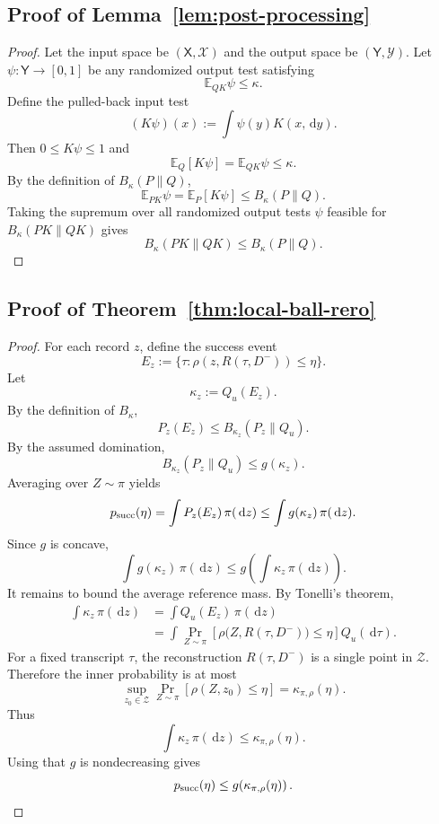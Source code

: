\documentclass[11pt,a4paper]{report}
\theoremstyle{plain}
\theoremstyle{definition}
\theoremstyle{remark}
\newcommand{\E}{\mathbb{E}}
\newcommand{\cZ}{\mathcal{Z}}
\newcommand{\dd}{\,\mathrm d}
\begin{document}
\subsection{Proof of Lemma~\ref{lem:post-processing}}

\begin{proof}
Let the input space be $(\mathsf X,\mathcal X)$ and the output space be
$(\mathsf Y,\mathcal Y)$.  Let $\psi:\mathsf Y\to[0,1]$ be any randomized output
test satisfying
\[
\E_{QK}\psi\le \kappa.
\]
Define the pulled-back input test
\[
(K\psi)(x):=\int \psi(y)K(x,\dd y).
\]
Then $0\le K\psi\le1$ and
\[
\E_Q[K\psi]=\E_{QK}\psi\le\kappa.
\]
By the definition of $B_\kappa(P\|Q)$,
\[
\E_{PK}\psi=
\E_P[K\psi]
\le
B_\kappa(P\|Q).
\]
Taking the supremum over all randomized output tests $\psi$ feasible for
$B_\kappa(PK\|QK)$ gives
\[
B_\kappa(PK\|QK)\le B_\kappa(P\|Q).
\]
\end{proof}

\subsection{Proof of Theorem~\ref{thm:local-ball-rero}}

\begin{proof}
For each record $z$, define the success event
\[
E_z:=\{\tau:\rho(z,R(\tau,D^-))\le\eta\}.
\]
Let
\[
\kappa_z:=Q_u(E_z).
\]
By the definition of $B_\kappa$,
\[
P_z(E_z)\le B_{\kappa_z}(P_z\|Q_u).
\]
By the assumed domination,
\[
B_{\kappa_z}(P_z\|Q_u)
\le
 g(\kappa_z).
\]
Averaging over $Z\sim\pi$ yields
\[
p_{\rm succ}(\eta)
=
\int P_z(E_z)\,\pi(\dd z)
\le
\int g(\kappa_z)\,\pi(\dd z).
\]
Since $g$ is concave,
\[
\int g(\kappa_z)\,\pi(\dd z)
\le
 g\!\left(\int \kappa_z\,\pi(\dd z)\right).
\]
It remains to bound the average reference mass.  By Tonelli's theorem,
\begin{align*}
\int \kappa_z\,\pi(\dd z)
&=
\int Q_u(E_z)\,\pi(\dd z)\\
&=
\int
\Pr_{Z\sim\pi}\!\left[\rho\bigl(Z,R(\tau,D^-)\bigr)\le\eta\right]
Q_u(\dd\tau).
\end{align*}
For a fixed transcript $\tau$, the reconstruction $R(\tau,D^-)$ is a single
point in $\cZ$.  Therefore the inner probability is at most
\[
\sup_{z_0\in\cZ}
\Pr_{Z\sim\pi}\left[\rho(Z,z_0)\le\eta\right]
=
\kappa_{\pi,\rho}(\eta).
\]
Thus
\[
\int \kappa_z\,\pi(\dd z)\le\kappa_{\pi,\rho}(\eta).
\]
Using that $g$ is nondecreasing gives
\[
p_{\rm succ}(\eta)
\le
 g\!\left(\kappa_{\pi,\rho}(\eta)\right).
\]
\end{proof}
\end{document}
